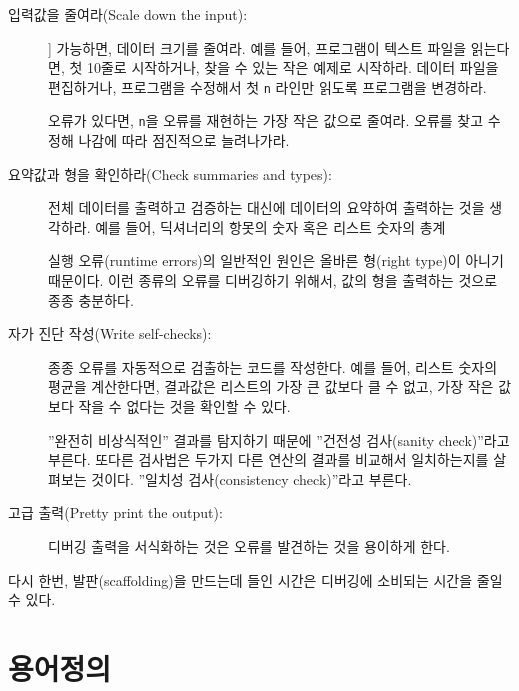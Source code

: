 \begin{description}

\item[입력값을 줄여라(Scale down the input):]]
가능하면, 데이터 크기를 줄여라. 예를 들어, 프로그램이 텍스트 파일을 읽는다면, 첫 10줄로 시작하거나, 찾을 수 있는 작은 예제로 시작하라.
데이터 파일을 편집하거나, 프로그램을 수정해서 첫 {\tt n} 라인만 읽도록 프로그램을 변경하라.

오류가 있다면, {\tt n}을 오류를 재현하는 가장 작은 값으로 줄여라. 오류를 찾고 수정해 나감에 따라 점진적으로 늘려나가라.

\item[ 요약값과 형을 확인하라(Check summaries and types):] 
전체 데이터를 출력하고 검증하는 대신에 데이터의 요약하여 출력하는 것을 생각하라. 예를 들어, 딕셔너리의 항못의 숫자 혹은 리스트 숫자의 총계

실행 오류(runtime errors)의 일반적인 원인은 올바른 형(right type)이 아니기 때문이다. 이런 종류의 오류를 디버깅하기 위해서,
값의 형을 출력하는 것으로 종종 충분하다.

\item[ 자가 진단 작성(Write self-checks):]

종종 오류를 자동적으로 검출하는 코드를 작성한다. 예를 들어, 리스트 숫자의 평균을 계산한다면, 결과값은 리스트의 가장 큰 값보다 클 수 없고, 
가장 작은 값보다 작을 수 없다는 것을 확인할 수 있다. 


''완전히 비상식적인'' 결과를 탐지하기 때문에 ''건전성 검사(sanity check)''라고 부른다.
또다른 검사법은 두가지 다른 연산의 결과를 비교해서 일치하는지를 살펴보는 것이다. ''일치성 검사(consistency check)''라고 부른다.

\item[ 고급 출력(Pretty print the output):] 디버깅 출력을 서식화하는 것은 오류를 발견하는 것을 용이하게 한다.

\end{description}

다시 한번, 발판(scaffolding)을 만드는데 들인 시간은 디버깅에 소비되는 시간을 줄일 수 있다.


\section{용어정의}

